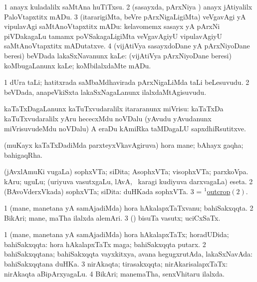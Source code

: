 \bentry
{}
\gl{\sakirx}
\bmng
\bnum
\num{1} anayx kuladalilx saMtAna huTiTxsu. 
\num{2} (sasayxda, pArxNiya \vi) anayx jAtiyalilx PaloVtapxtitx mADu. 
\num{3} (itararigiMta, beVre pArxNigaLigiMta) veVgavAgi yA vipulavAgi saMtAnoVtapxtitx mADu:  kelavomemx sasayx yA pArxNi piVDakagaLu tamamx poVSakagaLigiMta veVgavAgiyU vipulavAgiyU saMtAnoVtapxtitx mADutatxve. 
\num{4} (vijAtiVya sasayxdoDane yA pArxNiyoDane beresi) beVDada lakaSxNavanunx kaLe:  (vijAtiVya pArxNiyoDane beresi) koMbugaLanunx kaLe; koMbilalxdaMte mADu. 
\enum
\emng
\eentry

\bentry
{}
\gl{\nA}
\bmng
\bnum
\num{1} dUra taLi; hatitxrada saMbaMdhavirada pArxNigaLiMda taLi beLesuvudu. 
\num{2} beVDada, anapeVkiSxta lakaSxNagaLanunx ilalxdaMtAgisuvudu. 
\enum
\emng
\eentry

\bentry
{}
\gl{\sakirx}
\bmng
kaTaTxDagaLanunx kaTuTxvudaralilx itararanunx miVrisu:  kaTaTxDa kaTuTxvudaralilx yAru hececxMdu noVDalu (yAvudu yAvudanunx miVrisuvudeMdu noVDalu) A eraDu kAmiRka taMDagaLU sapxdhiRsutitxve. 
\emng
\eentry

\bentry
{}
\gl{\nA}
\bmng
(muKayx kaTaTxDadiMda parxteyxVkavAgiruva) hora mane; bAhayx gaqha; bahigaqRha. 
\emng
\eentry

\bentry
{}
\gl{\nA}
\bmng
\bnum
{} (jAvxlAmuKi \mo vugaLa) 
\banum
{} sophxVTa; siDita; AsophxVTa; visophxVTa; parxkoVpa. 
 kAru; uguLu; (uriyuva vasutxgaLu, lAvA, \mo\ karagi kudiyuva darxvagaLa) eseta. 
\eanum
\numie
\num{2} (BAvoVderxVkada) sophxVTa; siDita:  duHKada sophxVTa. 
\num{3} = \hyperlink{outcrop(1)2}{$^1$outcrop\((2)\)}. 
\enum
\emng
\eentry

\bentry
{}
\gl{\nA}
\bmng
\bnum
\num{1} (mane, manetana yA samAjadiMda) hora hAkalapxTaTxvanu; bahiSakxqqta. 
\num{2} BikAri; mane, maTha ilalxda alemAri. 
\num{3} (\pArxparx) bisuTa vasutx; uciCxSaTx. 
\enum
\emng
\eentry

\bentry
{}
\gl{\gu}
\bmng
\bnum
\num{1} (mane, manetana yA samAjadiMda) hora hAkalapxTaTx; horadUDida; bahiSakxqqta:  hora hAkalapxTaTx maga; bahiSakxqqta putarx. 
\num{2} bahiSakxqqtana; bahiSakxqqta vayxkitxya, avana hegugxrutAda, lakaSxNavAda:  bahiSakxqqtana duHKa. 
\num{3} nirAkaqta; tirasakxqqta; nirAkarisalapxTaTx:  nirAkaqta aBipArxyagaLu. 
\num{4} BikAri; manemaTha, senxVhitaru ilalxda. 
\enum
\emng
\eentry

